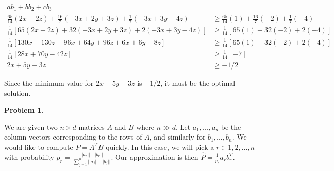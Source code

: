 \documentclass[11pt]{article}
\theoremstyle{definition}
\theoremstyle{case}
\theoremstyle{theorem}
\newtheorem{prob}{Problem}
\begin{document}
\begin{enumerate}[label=(\alph*)]
\begin{align*}
  ab_1 + bb_2 + cb_3 & \\
  \frac{65}{14} \left( 2x - 2z \right) + \frac{16}{7} \left( -3x + 2y + 3z \right) + \frac{1}{7} \left( -3x + 3y - 4z \right) &\geq \frac{65}{14} (1) + \frac{16}{7} (-2) + \frac{1}{7} (-4) \\
  \frac{1}{14} \left[ 65 \left( 2x - 2z \right) + 32 \left( -3x + 2y + 3z \right) + 2 \left( -3x + 3y - 4z \right) \right] &\geq \frac{1}{14} \left[ 65(1) + 32(-2) + 2(-4) \right] \\
  \frac{1}{14} \left[ 130x - 130z -96x + 64y + 96z + 6x + 6y - 8z \right] &\geq \frac{1}{14} \left[ 65(1) + 32(-2) + 2(-4) \right] \\
  \frac{1}{14} \left[ 28x + 70y - 42z \right] &\geq \frac{1}{14} \left[ -7 \right] \\
  2x + 5y -3z &\geq -1/2
\end{align*}

Since the minimum value for $2x + 5y -3z$ is $-1/2$, it must be the optimal solution.

\end{enumerate}

\newpage

\begin{prob}
\end{prob}

We are given two $n \times d$ matrices $A$ and $B$ where $n \gg d$. Let $a_1, ..., a_n$ be the column
vectors corresponding to the rows of $A$, and similarly for $b_1, ..., b_n$. We would like to compute $P = A^T B$
quickly. In this case, we will pick a $r \in 1, 2, ..., n$ with probability $p_r = \frac{||a_r|| \cdot ||b_r||}{\sum_{j=1}^n ||a_j|| \cdot ||b_j||}$.
Our approximation is then $\hat{P} = \frac{1}{p_r}a_r b_r^T$.
\end{document}
